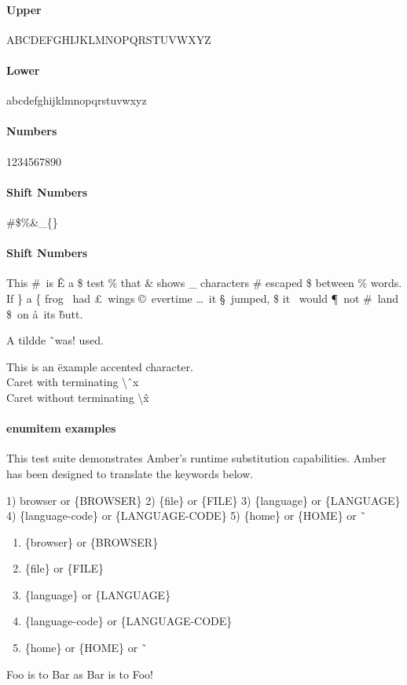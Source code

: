 \documentclass[14pt]{article}%
\begin{document}
%

\paragraph{Upper}
ABCDEFGHIJKLMNOPQRSTUVWXYZ

\paragraph{Lower}
abcdefghijklmnopqrstuvwxyz

\paragraph{Numbers}
1234567890

\paragraph{Shift Numbers}
\#\$\%\&\_\{\}

\paragraph{Shift Numbers}
This \#\ is \v{E} a \$ test \% that \& shows \_ characters \# escaped \$ between \%
words.  If \} a \{ frog \ddag\ had \pounds\ wings \copyright\ evertime \dots\
it \S\ jumped, \$ it \dag\ would \P\ not \#\ land \$\ on \aa\ its \^ butt.

A tildde \~\ was! used.

This is an \"{e}xample accented character.
\\
Caret with terminating \textbackslash \^\ x
\\
Caret without terminating \textbackslash \^ x

\paragraph{enumitem examples}
\begin{description}[align=right,leftmargin=3.2cm,labelindent=3.0cm]
  \item[Purpose:]
    This test suite demonstrates Amber's runtime substitution capabilities.
    Amber has been designed to translate the keywords below.

    1) {browser} or \{BROWSER\}
    2) \{file\} or \{FILE\}
    3) \{language\} or \{LANGUAGE\}
    4) \{language-code\} or \{LANGUAGE-CODE\}
    5) \{home\} or \{HOME\} or \~\

    \begin{enumerate}
      \item \{browser\} or \{BROWSER\}
      \item \{file\} or \{FILE\}
      \item \{language\} or \{LANGUAGE\}
      \item \{language-code\} or \{LANGUAGE-CODE\}
      \item \{home\} or \{HOME\} or \~\
    \end{enumerate}

  \item[Foo:] Foo is to Bar as Bar is to Foo!

\end{description}
\end{document}
